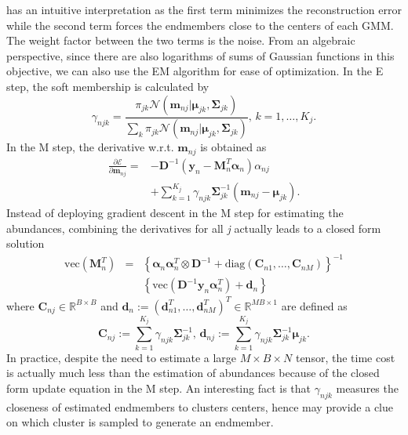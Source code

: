 \documentclass[twocolumn,english]{IEEEtran}
\theoremstyle{plain}
\begin{document}
has an intuitive interpretation as the first term minimizes the reconstruction
error while the second term forces the endmembers close to the centers
of each GMM. The weight factor between the two terms is the noise.
From an algebraic perspective, since there are also logarithms of
sums of Gaussian functions in this objective, we can also use the
EM algorithm for ease of optimization. In the E step, the soft membership
is calculated by
\[
\gamma_{njk}=\frac{\pi_{jk}\mathcal{N}\left(\mathbf{m}_{nj}\vert\boldsymbol{\mu}_{jk},\boldsymbol{\Sigma}_{jk}\right)}{\sum_{k}\pi_{jk}\mathcal{N}\left(\mathbf{m}_{nj}\vert\boldsymbol{\mu}_{jk},\boldsymbol{\Sigma}_{jk}\right)},\,k=1,\dots,K_{j}.
\]
In the M step, the derivative w.r.t. $\mathbf{m}_{nj}$ is obtained
as 
\begin{align*}
\frac{\partial\mathcal{E}}{\partial\mathbf{m}_{nj}}= & -\mathbf{D}^{-1}\left(\mathbf{y}_{n}-\mathbf{M}_{n}^{T}\boldsymbol{\alpha}_{n}\right)\alpha_{nj}\\
 & +\sum_{k=1}^{K_{j}}\gamma_{njk}\boldsymbol{\Sigma}_{jk}^{-1}\left(\mathbf{m}_{nj}-\boldsymbol{\mu}_{jk}\right).
\end{align*}
Instead of deploying gradient descent in the M step for estimating
the abundances, combining the derivatives for all \emph{j} actually
leads to a closed form solution
\begin{eqnarray*}
\text{vec}\left(\mathbf{M}_{n}^{T}\right) & = & \left\{ \boldsymbol{\alpha}_{n}\boldsymbol{\alpha}_{n}^{T}\otimes\mathbf{D}^{-1}+\text{diag}\left(\mathbf{C}_{n1},\dots,\mathbf{C}_{nM}\right)\right\} ^{-1}\\
 &  & \left\{ \text{vec}\left(\mathbf{D}^{-1}\mathbf{y}_{n}\boldsymbol{\alpha}_{n}^{T}\right)+\mathbf{d}_{n}\right\} 
\end{eqnarray*}
where $\mathbf{C}_{nj}\in\mathbb{R}^{B\times B}$ and $\mathbf{d}_{n}:=\left(\mathbf{d}_{n1}^{T},\dots,\mathbf{d}_{nM}^{T}\right)^{T}\in\mathbb{R}^{MB\times1}$
are defined as
\[
\mathbf{C}_{nj}:=\sum_{k=1}^{K_{j}}\gamma_{njk}\boldsymbol{\Sigma}_{jk}^{-1},\,\mathbf{d}_{nj}:=\sum_{k=1}^{K_{j}}\gamma_{njk}\boldsymbol{\Sigma}_{jk}^{-1}\boldsymbol{\mu}_{jk}.
\]
In practice, despite the need to estimate a large $M\times B\times N$
tensor, the time cost is actually much less than the estimation of
abundances because of the closed form update equation in the M step.
An interesting fact is that $\gamma_{njk}$ measures the closeness
of estimated endmembers to clusters centers, hence may provide a clue
on which cluster is sampled to generate an endmember.
\end{document}
